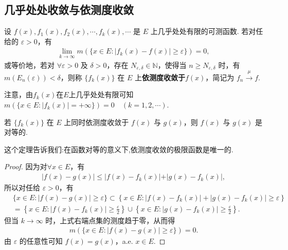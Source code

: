 \documentclass[../../main.tex]{subfiles}%
\begin{document}
\subsection{几乎处处收敛与依测度收敛}

\begin{definition}
设 $f(x),f_1(x),f_2(x),\cdots,f_k(x),\cdots$ 是 $E$ 上几乎处处有限的可测函数. 若对任给的 $\varepsilon>0$，有
\begin{align}
\lim_{k\to\infty}m(\{x\in E:\vert f_k(x)-f(x)\vert \geqslant \varepsilon\}) = 0,\label{eq:3.7}
\end{align}
或等价地，若对 $\forall\varepsilon > 0$ 及 $\delta > 0$，存在 $N_{\varepsilon,\delta}\in\mathbb{N}$，使得当 $n\geqslant N_{\varepsilon,\delta}$ 时，有 $m(E_n(\varepsilon)) < \delta$，则称 $\{f_k(x)\}$ 在 $E$ 上\textbf{依测度收敛于}$f(x)$，简记为 $f_n\stackrel{\mu}{\longrightarrow}f$. 
\end{definition}
\begin{remark}
注意，由$f_k(x)$在$E$上几乎处处有限可知$m(\{x\in E:\vert f_k(x)\vert=+\infty\}) = 0\quad (k = 1,2,\cdots)$. 
\end{remark}

\begin{theorem}\label{theorem:依测度收敛的极限函数必唯一}
若 $\{f_k(x)\}$ 在 $E$ 上同时依测度收敛于 $f(x)$ 与 $g(x)$，则 $f(x)$ 与 $g(x)$ 是对等的.
\end{theorem}
\begin{note}
这个定理告诉我们:在函数对等的意义下,依测度收敛的极限函数是唯一的.
\end{note}
\begin{proof}

因为对$\forall x\in E$，有
\begin{align*}
\vert f(x)-g(x)\vert\leqslant\vert f(x)-f_k(x)\vert+\vert g(x)-f_k(x)\vert,
\end{align*}
所以对任给 $\varepsilon>0$，有
\begin{align*}
&\{x\in E:\left| f(x)-g(x) \right|\geqslant \varepsilon \}\subset \left\{ x\in E:\left| f\left( x \right) -f_k\left( x \right) \right|+\left| g\left( x \right) -f_k\left( x \right) \right|\geqslant \varepsilon \right\} 
\\
&=\left\{ x\in E:\left| f(x)-f_k(x) \right|\geqslant \frac{\varepsilon}{2} \right\} \cup \left\{ x\in E:\left| g(x)-f_k(x) \right|\geqslant \frac{\varepsilon}{2} \right\} .
\end{align*}
但当 $k\to\infty$ 时，上式右端点集的测度趋于零，从而得
\begin{align*}
m(\{x\in E:\vert f(x)-g(x)\vert\geqslant \varepsilon\}) = 0.
\end{align*}
由 $\varepsilon$ 的任意性可知 $f(x)=g(x)$，a.e. $x\in E$. 

\end{proof}
\end{document}
